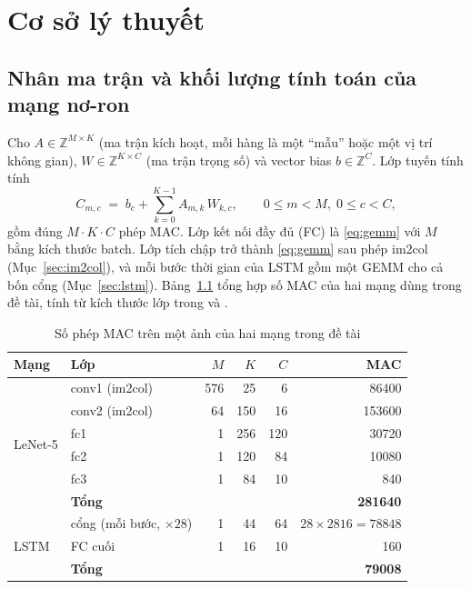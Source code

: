 \chapter{Cơ sở lý thuyết}
\label{ch:fund}

\section{Nhân ma trận và khối lượng tính toán của mạng nơ-ron}
Cho $A\in\mathbb{Z}^{M\times K}$ (ma trận kích hoạt, mỗi hàng là một ``mẫu'' hoặc một vị trí không gian), $W\in\mathbb{Z}^{K\times C}$ (ma trận trọng số) và vector bias $b\in\mathbb{Z}^{C}$. Lớp tuyến tính tính
\begin{equation}
  C_{m,c} \;=\; b_c + \sum_{k=0}^{K-1} A_{m,k}\, W_{k,c}, \qquad 0\le m<M,\; 0\le c<C,
  \label{eq:gemm}
\end{equation}
gồm đúng $M\cdot K\cdot C$ phép MAC. Lớp kết nối đầy đủ (FC) là \eqref{eq:gemm} với $M$ bằng kích thước batch. Lớp tích chập trở thành \eqref{eq:gemm} sau phép im2col (Mục~\ref{sec:im2col}), và mỗi bước thời gian của LSTM gồm một GEMM cho cả bốn cổng (Mục~\ref{sec:lstm}). Bảng~\ref{tab:macs} tổng hợp số MAC của hai mạng dùng trong đề tài, tính từ kích thước lớp trong  và .

\begin{table}[H]
  \centering
  \caption{Số phép MAC trên một ảnh của hai mạng trong đề tài}
  \label{tab:macs}
  \begin{tabular}{llrrrr}
    \toprule
    Mạng & Lớp & $M$ & $K$ & $C$ & MAC \\
    \midrule
    \multirow{6}{*}{LeNet-5} & conv1 (im2col) & 576 & 25 & 6 & \num{86400}\\
     & conv2 (im2col) & 64 & 150 & 16 & \num{153600}\\
     & fc1 & 1 & 256 & 120 & \num{30720}\\
     & fc2 & 1 & 120 & 84 & \num{10080}\\
     & fc3 & 1 & 84 & 10 & \num{840}\\
     & \textbf{Tổng} & & & & \textbf{\num{281640}}\\
    \midrule
    \multirow{3}{*}{LSTM} & cổng (mỗi bước, $\times 28$) & 1 & 44 & 64 & $28\times\num{2816}=\num{78848}$\\
     & FC cuối & 1 & 16 & 10 & \num{160}\\
     & \textbf{Tổng} & & & & \textbf{\num{79008}}\\
    \bottomrule
  \end{tabular}
\end{table}

